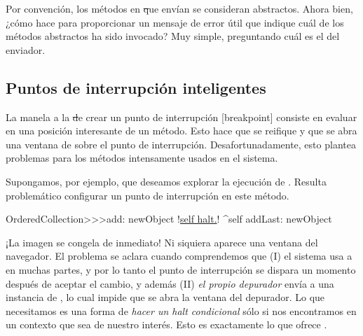 \documentclass[a4paper,10pt,twoside]{book}
\begin{document}
Por convención, los métodos en \st que envían 
se consideran abstractos.  Ahora bien, ¿cómo
hace  para proporcionar un
mensaje de error útil que indique cuál de los métodos abstractos ha
sido invocado?  Muy simple, preguntando cuál es el 
del enviador.

 
\subsection{Puntos de interrupción inteligentes}


La manela a la \st de crear un punto de interrupción [breakpoint]
consiste en evaluar  en una posición interesante de un
método.  Esto hace que  se reifique y que se abra una
ventana de  sobre el punto de interrupción.
Desafortunadamente, esto plantea problemas para los métodos
intensamente usados en el sistema.

Supongamos, por ejemplo, que deseamos explorar la ejecución de
.  Resulta problemático configurar un
punto de interrupción en este método.

\begin{code}{}
OrderedCollection>>>add: newObject
        !\underline{self halt.}!
        ^self addLast: newObject
\end{code}

¡La imagen se congela de inmediato!  Ni siquiera aparece una ventana
del navegador.  El problema se aclara cuando comprendemos que
(\textsc{I}) el sistema usa a  en muchas
partes, y por lo tanto el punto de interrupción se dispara un momento
después de aceptar el cambio, y además (\textsc{II}) \emph{el propio
  depurador} envía  a una instancia de
, lo cual impide que se abra la ventana del
depurador.  Lo que necesitamos es una forma de \emph{hacer un halt
  condicional} sólo si nos encontramos en un contexto que sea de
nuestro interés.  Esto es exactamente lo que ofrece
.
\end{document}

